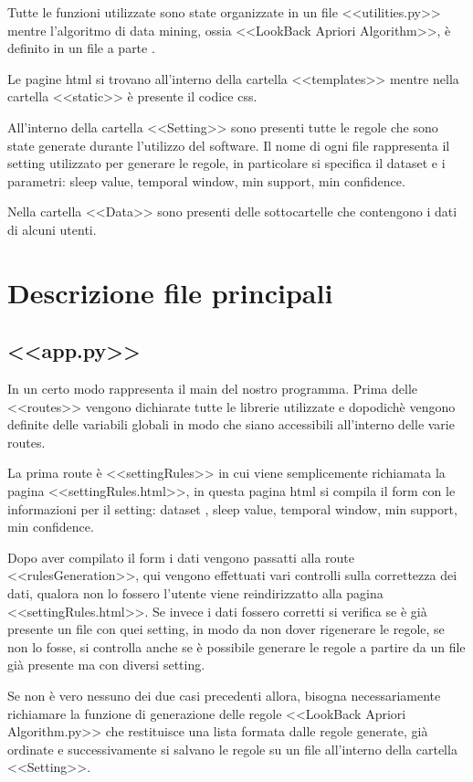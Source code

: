 \documentclass[a4paper]{article}
\begin{document}
Tutte le funzioni utilizzate sono state organizzate in un file <<utilities.py>> mentre l'algoritmo di data mining, ossia <<LookBack Apriori Algorithm>>, è definito in un file a parte .

Le pagine html si trovano all'interno della cartella <<templates>> mentre nella cartella <<static>> è presente il codice css.

All'interno della cartella <<Setting>> sono presenti tutte le regole che sono state generate durante l'utilizzo del software. Il nome di ogni file rappresenta il setting utilizzato per generare le regole, in particolare si specifica il dataset  e i parametri:  sleep value, temporal window, min support, min confidence.

Nella cartella <<Data>> sono presenti delle sottocartelle che contengono i dati di alcuni utenti.

\section{Descrizione file principali}
\subsection{<<app.py>>}
In un certo modo rappresenta il main del nostro programma.
Prima delle <<routes>> vengono dichiarate tutte le librerie  utilizzate e dopodichè vengono definite delle variabili globali in modo che siano accessibili all'interno delle varie routes.

La prima route è <<settingRules>> in cui viene semplicemente richiamata la pagina <<settingRules.html>>, in questa pagina html si compila il form con le informazioni per il setting: dataset , sleep value, temporal window, min support, min confidence. 

Dopo aver compilato il form i dati vengono passatti alla route <<rulesGeneration>>, qui vengono effettuati vari controlli sulla correttezza dei dati, qualora non lo fossero l'utente viene reindirizzatto alla pagina <<settingRules.html>>. Se invece i dati fossero corretti si verifica se è già presente un file con quei  setting, in modo da non dover rigenerare le regole, se non lo fosse, si controlla anche se è possibile generare le regole a partire da un file già presente ma con diversi setting.

 Se non è vero nessuno dei due casi precedenti allora, bisogna necessariamente  richiamare la funzione di generazione delle regole <<LookBack Apriori Algorithm.py>> che restituisce una lista formata dalle regole generate, già ordinate e successivamente si salvano le regole su un file all'interno della cartella <<Setting>>.
\end{document}
